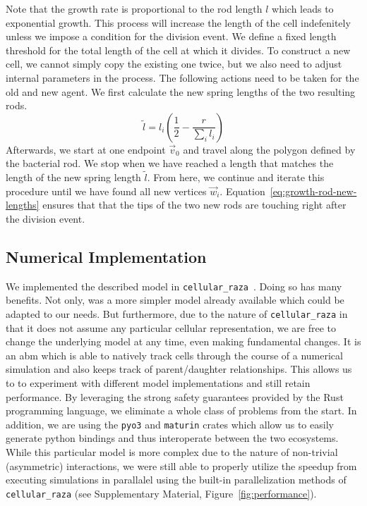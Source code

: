 \documentclass{article}
\begin{document}
Note that the growth rate is proportional to the rod length $l$ which leads to exponential growth.
This process will increase the length of the cell indefenitely unless we impose a condition for the
division event.
We define a fixed length threshold for the total length of the cell at which it divides.
To construct a new cell, we cannot simply copy the existing one twice, but we also need to adjust
internal parameters in the process.
The following actions need to be taken for the old and new agent.
We first calculate the new spring lengths of the two resulting rods.
\begin{equation}
    \tilde{l} = l_i\left(\frac{1}{2} - \frac{r}{\sum\limits_i l_i}\right)
    \label{eq:growth-rod-new-lengths}
\end{equation}
Afterwards, we start at one endpoint $\vec{v}_0$ and travel along the polygon defined by the
bacterial rod.
We stop when we have reached a length that matches the length of the new spring length $\tilde{l}$.
From here, we continue and iterate this procedure until we have found all new vertices $\vec{w}_i$.
Equation~\ref{eq:growth-rod-new-lengths} ensures that that the tips of the two new rods are touching
right after the division event.

\subsection{Numerical Implementation}

We implemented the described model in \texttt{cellular\_raza}~\cite{Pleyer2025}.
Doing so has many benefits.
Not only, was a more simpler model already available which could be adapted to our needs.
But furthermore, due to the nature of \texttt{cellular\_raza} in that it does not assume any
particular cellular representation, we are free to change the underlying model at any time, even
making fundamental changes.
It is an \ac{abm} which is able to natively track cells through the course of a numerical simulation
and also keeps track of parent/daughter relationships.
This allows us to to experiment with different model implementations and still retain performance.
By leveraging the strong safety guarantees provided by the Rust programming language, we eliminate a
whole class of problems from the start.
In addition, we are using the \texttt{pyo3} and \texttt{maturin} crates which allow us to easily
generate python bindings and thus interoperate between the two ecosystems.
While this particular model is more complex due to the nature of non-trivial (asymmetric)
interactions, we were still able to properly utilize the speedup from executing simulations in
parallalel using the built-in parallelization methods of \texttt{cellular\_raza} (see
Supplementary Material, Figure~\ref{fig:performance}).
\end{document}
